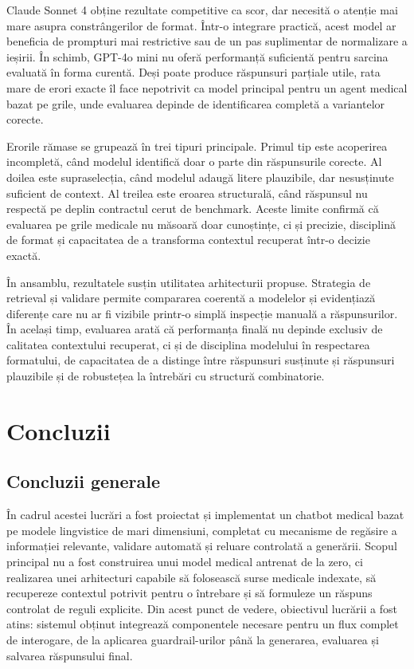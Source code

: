 \documentclass[12pt, a4paper, oneside, romanian]{teza-upb}
\begin{document}
Claude Sonnet 4 obține rezultate competitive ca scor, dar necesită o atenție mai mare asupra constrângerilor de format. Într-o integrare practică, acest model ar beneficia de prompturi mai restrictive sau de un pas suplimentar de normalizare a ieșirii. În schimb, GPT-4o mini nu oferă performanță suficientă pentru sarcina evaluată în forma curentă. Deși poate produce răspunsuri parțiale utile, rata mare de erori exacte îl face nepotrivit ca model principal pentru un agent medical bazat pe grile, unde evaluarea depinde de identificarea completă a variantelor corecte.

Erorile rămase se grupează în trei tipuri principale. Primul tip este acoperirea incompletă, când modelul identifică doar o parte din răspunsurile corecte. Al doilea este supraselecția, când modelul adaugă litere plauzibile, dar nesusținute suficient de context. Al treilea este eroarea structurală, când răspunsul nu respectă pe deplin contractul cerut de benchmark. Aceste limite confirmă că evaluarea pe grile medicale nu măsoară doar cunoștințe, ci și precizie, disciplină de format și capacitatea de a transforma contextul recuperat într-o decizie exactă.

În ansamblu, rezultatele susțin utilitatea arhitecturii propuse. Strategia de retrieval și validare permite compararea coerentă a modelelor și evidențiază diferențe care nu ar fi vizibile printr-o simplă inspecție manuală a răspunsurilor. În același timp, evaluarea arată că performanța finală nu depinde exclusiv de calitatea contextului recuperat, ci și de disciplina modelului în respectarea formatului, de capacitatea de a distinge între răspunsuri susținute și răspunsuri plauzibile și de robustețea la întrebări cu structură combinatorie.
\chapter{Concluzii}
\section{Concluzii generale}

În cadrul acestei lucrări a fost proiectat și implementat un chatbot medical bazat pe modele lingvistice de mari dimensiuni, completat cu mecanisme de regăsire a informației relevante, validare automată și reluare controlată a generării. Scopul principal nu a fost construirea unui model medical antrenat de la zero, ci realizarea unei arhitecturi capabile să folosească surse medicale indexate, să recupereze contextul potrivit pentru o întrebare și să formuleze un răspuns controlat de reguli explicite. Din acest punct de vedere, obiectivul lucrării a fost atins: sistemul obținut integrează componentele necesare pentru un flux complet de interogare, de la aplicarea guardrail-urilor până la generarea, evaluarea și salvarea răspunsului final.
\end{document}
